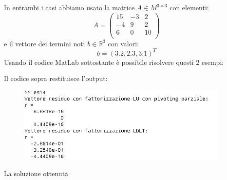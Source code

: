 \label{es314}
\begin{flushleft}
In entrambi i casi abbiamo usato la matrice $A\in M^{3\times 3}$ con elementi:
\[ 
A =
\begin{pmatrix}
    15  & -3 &  2 \\
   -4  &  9  &  2 \\
    6  &  0  &  10 \\
\end{pmatrix}
\]
e il vettore dei termini noti $b\in \mathbb{R}^3$ con valori:
\[
{b} = (3.2, 2.3, 3.1)^T
\]
Usando il codice MatLab sottostante è possibile risolvere questi 2 esempi:
\newpage

Il codice sopra restituisce l'output:
\begin{figure}[h]
\includegraphics[left, width=400px]{cap_3/es14/es314.png}
\end{figure}
La soluzione ottenuta 
\end{flushleft}